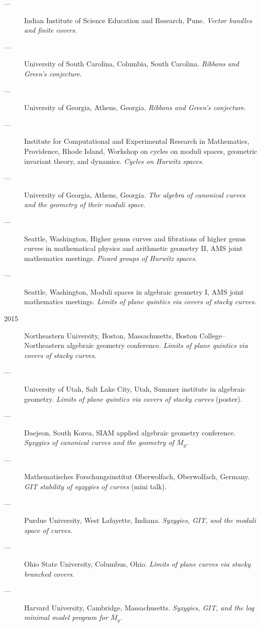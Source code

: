 \documentclass[11pt]{article}
\begin{document}
\begin{description}
\item[{---}] Indian Institute of Science Education and Research, Pune. \emph{Vector bundles and finite covers}.
\item[{---}] University of South Carolina, Columbia, South Carolina. \emph{Ribbons and Green's conjecture}.
\item[{---}] University of Georgia, Athens, Georgia. \emph{Ribbons and Green's conjecture}.
\item[{---}] Institute for Computational and Experimental Research in Mathematics, Providence, Rhode Island, Workshop on cycles on moduli spaces, geometric invariant theory, and dynamics. \emph{Cycles on Hurwitz spaces}.
\item[{---}] University of Georgia, Athens, Georgia. \emph{The algebra of canonical curves and the geometry of their moduli space}.
\item[{---}] Seattle, Washington, Higher genus curves and fibrations of higher genus curves in mathematical physics and arithmetic geometry II, AMS joint mathematics meetings. \emph{Picard groups of Hurwitz spaces}.
\item[{---}] Seattle, Washington, Moduli spaces in algebraic geometry I, AMS joint mathematics meetings. \emph{Limits of plane quintics via covers of stacky curves}.
\item[{2015}] Northeastern University, Boston, Massachusetts, Boston College--Northeastern algebraic geometry conference. \emph{Limits of plane quintics via covers of stacky curves}.
\item[{---}] University of Utah, Salt Lake City, Utah, Summer institute in algebraic geometry. \emph{Limits of plane quintics via covers of stacky curves} (poster).
\item[{---}] Daejeon, South Korea, SIAM applied algebraic geometry conference. \emph{Syzygies of canonical curves and the geometry of \(\overline M_g\)}.
\item[{---}] Mathematisches Forschungsinstitut Oberwolfach, Oberwolfach, Germany. \emph{GIT stability of syzygies of curves} (mini talk).
\item[{---}] Purdue University, West Lafayette, Indiana. \emph{Syzygies, GIT, and the moduli space of curves}.
\item[{---}] Ohio State University, Columbus, Ohio. \emph{Limits of plane curves via stacky branched covers}.
\item[{---}] Harvard University, Cambridge, Massachusetts. \emph{Syzygies, GIT, and the log minimal model program for \(\overline{M}_g\)}.

\end{description}
\end{document}
